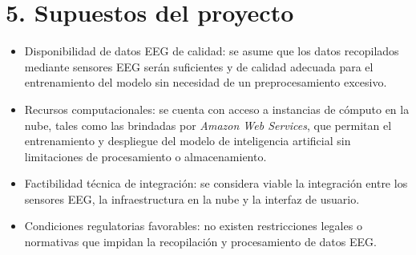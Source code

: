\documentclass[
11pt, %
]{charter}
\begin{document}


\section{5. Supuestos del proyecto}
\label{sec:supuestos}
\begin{itemize}
	\item Disponibilidad de datos EEG de calidad: se asume que los datos recopilados mediante sensores EEG serán suficientes y de calidad adecuada para el entrenamiento del modelo sin necesidad de un preprocesamiento excesivo.
	\item Recursos computacionales: se cuenta con acceso a instancias de cómputo en la nube, tales como las brindadas por \textit{Amazon Web Services}, que permitan el entrenamiento y despliegue del modelo de inteligencia artificial sin limitaciones de procesamiento o almacenamiento.
	\item Factibilidad técnica de integración: se considera viable la integración entre los sensores EEG, la infraestructura en la nube y la interfaz de usuario.
	\item Condiciones regulatorias favorables: no existen restricciones legales o normativas que impidan la recopilación y procesamiento de datos EEG.
\end{itemize}

\end{document}
